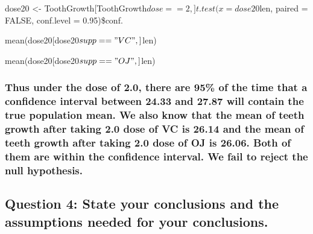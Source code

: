 \documentclass[
]{article}
\begin{document}
dose20 \textless-
ToothGrowth{[}ToothGrowth\(dose == 2, ] t.test(x = dose20\)len, paired =
FALSE, conf.level = 0.95)\$conf.

mean(dose20{[}dose20\(supp == "VC", ]\)len)

mean(dose20{[}dose20\(supp == "OJ", ]\)len)

\hypertarget{thus-under-the-dose-of-2.0-there-are-95-of-the-time-that-a-confidence-interval-between-24.33-and-27.87-will-contain-the-true-population-mean.-we-also-know-that-the-mean-of-teeth-growth-after-taking-2.0-dose-of-vc-is-26.14-and-the-mean-of-teeth-growth-after-taking-2.0-dose-of-oj-is-26.06.-both-of-them-are-within-the-confidence-interval.-we-fail-to-reject-the-null-hypothesis.}{%
\subsubsection{Thus under the dose of 2.0, there are 95\% of the time
that a confidence interval between 24.33 and 27.87 will contain the true
population mean. We also know that the mean of teeth growth after taking
2.0 dose of VC is 26.14 and the mean of teeth growth after taking 2.0
dose of OJ is 26.06. Both of them are within the confidence interval. We
fail to reject the null
hypothesis.}\label{thus-under-the-dose-of-2.0-there-are-95-of-the-time-that-a-confidence-interval-between-24.33-and-27.87-will-contain-the-true-population-mean.-we-also-know-that-the-mean-of-teeth-growth-after-taking-2.0-dose-of-vc-is-26.14-and-the-mean-of-teeth-growth-after-taking-2.0-dose-of-oj-is-26.06.-both-of-them-are-within-the-confidence-interval.-we-fail-to-reject-the-null-hypothesis.}}

\hypertarget{question-4-state-your-conclusions-and-the-assumptions-needed-for-your-conclusions.}{%
\subsection{Question 4: State your conclusions and the assumptions
needed for your
conclusions.}\label{question-4-state-your-conclusions-and-the-assumptions-needed-for-your-conclusions.}}
\end{document}
